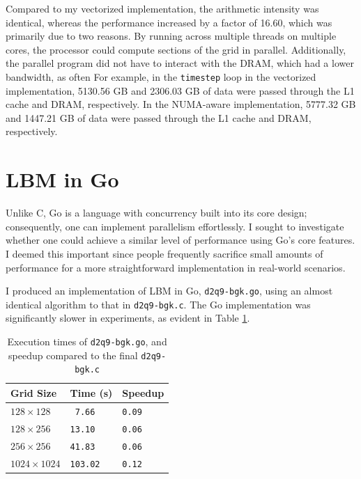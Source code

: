 \documentclass[twocolumn, a4paper]{article}
\begin{document}
Compared to my vectorized implementation, the arithmetic intensity was identical, whereas the performance increased by a factor of 16.60, which was primarily due to two reasons.
By running across multiple threads on multiple cores, the processor could compute sections of the grid in parallel.
Additionally, the parallel program did not have to interact with the DRAM, which had a lower bandwidth, as often
For example, in the \texttt{timestep} loop in the vectorized implementation, 5130.56 GB and 2306.03 GB of data were passed through the L1 cache and DRAM, respectively.
In the NUMA-aware implementation, 5777.32 GB and 1447.21 GB of data were passed through the L1 cache and DRAM, respectively. 

\section{LBM in Go}

Unlike C, Go is a language with concurrency built into its core design; consequently, one can implement parallelism effortlessly.
I sought to investigate whether one could achieve a similar level of performance using Go's core features.
I deemed this important since people frequently sacrifice small amounts of performance for a more straightforward implementation in real-world scenarios.

I produced an implementation of LBM in Go, \texttt{d2q9-bgk.go}, using an almost identical algorithm to that in \texttt{d2q9-bgk.c}.
The Go implementation was significantly slower in experiments, as evident in Table \ref{tab:go}.

\begin{table}[htbp]
  \begin{center}
  \caption{Execution times of \texttt{d2q9-bgk.go}, and speedup compared to the final \texttt{d2q9-bgk.c}}\label{tab:go}
  \begin{tabular}[t]{l | l l} 
      \hline\hline
      Grid Size&Time (s)&Speedup\\
      \hline
      $128 \times 128$&\texttt{ 7.66}&\texttt{0.09}\\
      $128 \times 256$&\texttt{13.10}&\texttt{0.06}\\
      $256 \times 256$&\texttt{41.83}&\texttt{0.06}\\
      $1024 \times 1024$&\texttt{103.02}&\texttt{0.12}\\
      \hline
    \end{tabular}
  \end{center}
\end{table}
\end{document}
